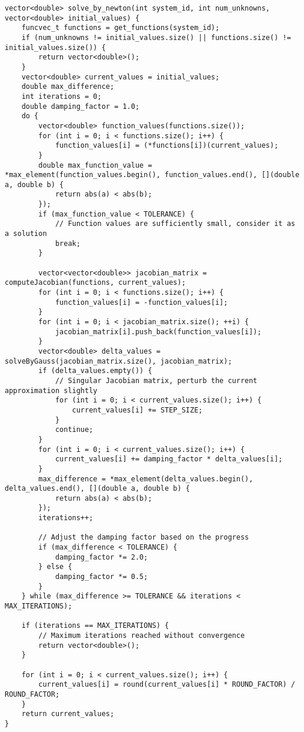 \begin{lstlisting}
vector<double> solve_by_newton(int system_id, int num_unknowns, vector<double> initial_values) {
    funcvec_t functions = get_functions(system_id);
    if (num_unknowns != initial_values.size() || functions.size() != initial_values.size()) {
        return vector<double>();
    }
    vector<double> current_values = initial_values;
    double max_difference;
    int iterations = 0;
    double damping_factor = 1.0;
    do {
        vector<double> function_values(functions.size());
        for (int i = 0; i < functions.size(); i++) {
            function_values[i] = (*functions[i])(current_values);
        }
        double max_function_value = *max_element(function_values.begin(), function_values.end(), [](double a, double b) {
            return abs(a) < abs(b);
        });
        if (max_function_value < TOLERANCE) {
            // Function values are sufficiently small, consider it as a solution
            break;
        }

        vector<vector<double>> jacobian_matrix = computeJacobian(functions, current_values);
        for (int i = 0; i < functions.size(); i++) {
            function_values[i] = -function_values[i];
        }
        for (int i = 0; i < jacobian_matrix.size(); ++i) {
            jacobian_matrix[i].push_back(function_values[i]);
        }
        vector<double> delta_values = solveByGauss(jacobian_matrix.size(), jacobian_matrix);
        if (delta_values.empty()) {
            // Singular Jacobian matrix, perturb the current approximation slightly
            for (int i = 0; i < current_values.size(); i++) {
                current_values[i] += STEP_SIZE;
            }
            continue;
        }
        for (int i = 0; i < current_values.size(); i++) {
            current_values[i] += damping_factor * delta_values[i];
        }
        max_difference = *max_element(delta_values.begin(), delta_values.end(), [](double a, double b) {
            return abs(a) < abs(b);
        });
        iterations++;

        // Adjust the damping factor based on the progress
        if (max_difference < TOLERANCE) {
            damping_factor *= 2.0;
        } else {
            damping_factor *= 0.5;
        }
    } while (max_difference >= TOLERANCE && iterations < MAX_ITERATIONS);

    if (iterations == MAX_ITERATIONS) {
        // Maximum iterations reached without convergence
        return vector<double>();
    }

    for (int i = 0; i < current_values.size(); i++) {
        current_values[i] = round(current_values[i] * ROUND_FACTOR) / ROUND_FACTOR;
    }
    return current_values;
}
\end{lstlisting}
